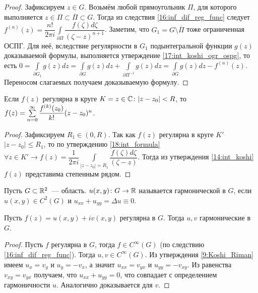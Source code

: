 \begin{proof}
    Зафиксируем \(z \in G\). Возьмём любой прямоугольник \(\Pi\), для которого выполняется \(z \in
    \Pi \subset \overline{\Pi} \subset G\). Тогда из следствия \ref{16:inf_dif_reg_func} следует
    \(f^{(n)}(z) = \dfrac{n!}{2 \pi i} \int\limits_{\partial \Pi} \dfrac{f(\zeta) d\zeta}
    {(\zeta - z)^{n+1}}\). Заметим, что \(G_1 = G \setminus \overline{\Pi}\) тоже ограниченная ОСПГ.
    Для неё, вследствие регулярности в \(G_1\) подынтегральной функции \(g(z)\) доказываемой
    формулы, выполняется утверждение \ref{17:int_koshi_ogr_ospg}, то есть \(0 =
    \int\limits_{\partial G_1} g(z) dz = \int\limits_{\partial G} g(z) dz +
    \int\limits_{\partial \Pi ^{-1}} g(z) dz = \int\limits_{\partial G} g(z) dz - f^{(n)}(z)\).
    Переносом слагаемых получаем доказываемую формулу.
\end{proof}

\begin{corollary}
    Если \(f(z)\) регулярна в круге \(K = {z \in \mathbb{C} \colon |z-z_0| < R}\), то
    \(f(z) \hm= \sum\limits_{n = 0}^\infty \dfrac{f^{(k)}(z_0)}{k!} (z-z_0)^n\).
\end{corollary}

\begin{proof}
    Зафиксируем \(R_1 \in (0, R)\). Так как \(f(z)\) регулярна в круге \(K'\) \(|z-z_0| \le R_1\),
    то по утверждению \ref{18:int_formula} \(\forall z \in K' \rightarrow f(z) = \dfrac{1}{2 \pi i}
    \int\limits_{|z-z_0|=R_1} \dfrac{f(\zeta) d\zeta}{(\zeta - z)}\). Тогда из
    утверждения \ref{14:int_koshi} \(f(z)\) представима степенным рядом.
\end{proof}



\begin{definition}
    Пусть \(G \subset \mathbb{R}^2\)~--- область. \(u(x, y) \colon G\rightarrow\mathbb{R}\) называется гармонической
    в \(G\), если \(u(x, y) \in C^2(G)\) и \(u_{xx} + u_{yy} = \Delta u \equiv 0\).
\end{definition}

\begin{statement}
    Пусть \(f(z) = u(x, y) + iv(x, y)\) регулярна в \(G\). Тогда \(u, v\) гармонические в \(G\).
\end{statement}

\begin{proof}
    Пусть \(f\) регулярна в \(G\), тогда \(f \in C^\infty(G)\) (по следствию
    \ref{16:inf_dif_reg_func}). Тогда \(u, v \in C^\infty(G)\). Из утверждения \ref{9:Koshi_Riman}
    имеем \(u_x = v_y\) и \(u_y = -v_x\), а значит \(u_{xx} = v_{yx}\) и \(u_{yy} = -v_{xy}\).
    Из равенства \(v_{xy} = v_{yx}\) получаем, что \(u_{xx} + u_{yy} = 0\), что совпадает с
    определением гармоничности \(u\). Аналогично доказывается для \(v\).
\end{proof}

